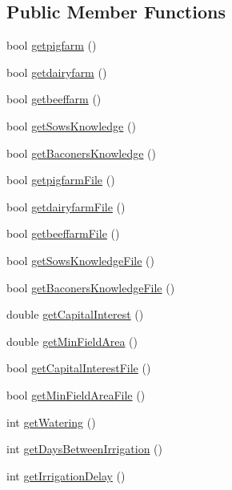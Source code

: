 \subsection*{Public Member Functions}
\begin{DoxyCompactItemize}
\item 
bool \hyperlink{classfarm_data_a91709d465272ff30629fe34c3584229f}{getpigfarm} ()
\item 
bool \hyperlink{classfarm_data_a02a60e838e3e3056ca5ba983f3ec874f}{getdairyfarm} ()
\item 
bool \hyperlink{classfarm_data_adc3da31ffca5aee7c893d112d8374be8}{getbeeffarm} ()
\item 
bool \hyperlink{classfarm_data_aa0c2ad7153088adff0e86179ec06da19}{getSowsKnowledge} ()
\item 
bool \hyperlink{classfarm_data_abb4c880543b25ffdd508e20723362cba}{getBaconersKnowledge} ()
\item 
bool \hyperlink{classfarm_data_aa209bdab6aefb7de3d008df5f7b2dca0}{getpigfarmFile} ()
\item 
bool \hyperlink{classfarm_data_a49f48626133e3616cbafa2e158a45255}{getdairyfarmFile} ()
\item 
bool \hyperlink{classfarm_data_a70fbbca25a9f70237844f15c034c2a11}{getbeeffarmFile} ()
\item 
bool \hyperlink{classfarm_data_a167fe053f54e542e746c2eb46a85d051}{getSowsKnowledgeFile} ()
\item 
bool \hyperlink{classfarm_data_ad5e87ebf838260c10d07f9ffccd1bfbc}{getBaconersKnowledgeFile} ()
\item 
double \hyperlink{classfarm_data_a639ebaf1060358d4c6b67ba41dfb4929}{getCapitalInterest} ()
\item 
double \hyperlink{classfarm_data_a38e44d02817a78bc29aeb6c62bd57043}{getMinFieldArea} ()
\item 
bool \hyperlink{classfarm_data_a39eea7de86f46c9ca07a358f9e89f933}{getCapitalInterestFile} ()
\item 
bool \hyperlink{classfarm_data_aada4ac3a7cc5c6a40736bdeb3b126c30}{getMinFieldAreaFile} ()
\item 
int \hyperlink{classfarm_data_a254a19218188f4e0144d1d64eb15359f}{getWatering} ()
\item 
int \hyperlink{classfarm_data_ad132b302da9b3e881eb32128b757c033}{getDaysBetweenIrrigation} ()
\item 
int \hyperlink{classfarm_data_aef1a96504b81439a5b1a843dd015f727}{getIrrigationDelay} ()
\item 

\end{DoxyCompactItemize}
